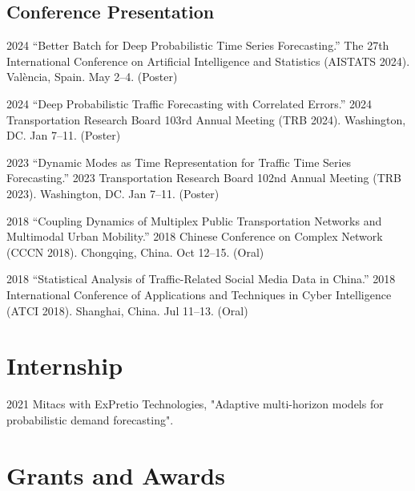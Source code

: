 \documentclass[12pt,letterpaper]{report}
\begin{document}
    \subsection*{Conference Presentation}
    \begin{tablist}
        \item[2024] \tab  \enquote{Better Batch for Deep Probabilistic Time Series Forecasting.} The 27th International Conference on Artificial Intelligence and Statistics (AISTATS 2024). València, Spain. May 2--4. (Poster)
        \item[2024] \tab  \enquote{Deep Probabilistic Traffic Forecasting with Correlated Errors.} 2024 Transportation Research Board 103rd Annual Meeting (TRB 2024). Washington, DC. Jan 7--11. (Poster)
        \item[2023] \tab  \enquote{Dynamic Modes as Time Representation for Traffic Time Series Forecasting.} 2023 Transportation Research Board 102nd Annual Meeting (TRB 2023). Washington, DC. Jan 7--11. (Poster)
        \item[2018] \tab  \enquote{Coupling Dynamics of Multiplex Public Transportation Networks and Multimodal Urban Mobility.} 2018 Chinese Conference on Complex Network (CCCN 2018). Chongqing, China. Oct 12--15. (Oral)
        \item[2018] \tab  \enquote{Statistical Analysis of Traffic-Related Social Media Data in China.} 2018 International Conference of Applications and Techniques in Cyber Intelligence (ATCI 2018). Shanghai, China. Jul 11--13. (Oral)
    \end{tablist}

    \section*{Internship}
    \begin{tablist}
        \item[2021] \tab  Mitacs with ExPretio Technologies, "Adaptive multi-horizon models for probabilistic demand forecasting".
    \end{tablist}

    \section*{Grants and Awards}
\end{document}
